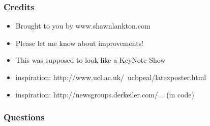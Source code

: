\documentclass[serif,mathserif]{beamer}
\begin{document}
\begin{frame}
  \frametitle{Credits}
  \begin{itemize}
  \item Brought to you by www.shawnlankton.com
  \item Please let me know about improvements!
  \item This was supposed to look like a KeyNote Show
  \item inspiration: http://www.ucl.ac.uk/~ucbpeal/latexposter.html
  \item inspiration: http://newsgroups.derkeiler.com/... (in code)
  \end{itemize}
\end{frame}

\begin{frame}
  \frametitle{Questions}
\end{frame}
\end{document}
